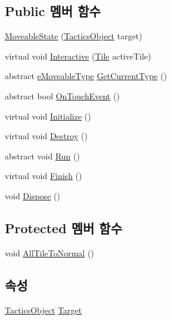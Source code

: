 \subsection*{Public 멤버 함수}
\begin{DoxyCompactItemize}
\item 
\hyperlink{class_move_decorator_1_1_moveable_state_ae0130d6fdd6bb1dfd07a1f4c202dd6b0}{Moveable\+State} (\hyperlink{class_tactics_object}{Tactics\+Object} target)
\item 
virtual void \hyperlink{class_move_decorator_1_1_moveable_state_a1e66885aa7daf1021fc654b706b53ab8}{Interactive} (\hyperlink{class_tile}{Tile} active\+Tile)
\item 
abstract \hyperlink{_move_decorator_8cs_a90215797ba850e199f3ef63d7c56f132}{e\+Moveable\+Type} \hyperlink{class_move_decorator_1_1_moveable_state_a4759ac86dafc924c1de16e715c759ad6}{Get\+Current\+Type} ()
\item 
abstract bool \hyperlink{class_move_decorator_1_1_moveable_state_a157667c151f6b77c89f0ea7f37858525}{On\+Touch\+Event} ()
\item 
virtual void \hyperlink{class_m_c_n_1_1_state_a5be59bc891e64cbbe4322d74a6746908}{Initialize} ()
\item 
virtual void \hyperlink{class_m_c_n_1_1_state_aebf48ef248bbf185d6aae91d9789459e}{Destroy} ()
\item 
abstract void \hyperlink{class_m_c_n_1_1_state_afdec72a816a8a8ec584cac758a027215}{Run} ()
\item 
virtual void \hyperlink{class_m_c_n_1_1_state_a2492ca731678b8216c02134dddeeb745}{Finish} ()
\item 
void \hyperlink{class_m_c_n_1_1_state_af6df0477e0dead784489688cb2c2093e}{Dispose} ()
\end{DoxyCompactItemize}
\subsection*{Protected 멤버 함수}
\begin{DoxyCompactItemize}
\item 
void \hyperlink{class_move_decorator_1_1_moveable_state_a2b63f058084f2548f8547c21715d271c}{All\+Tile\+To\+Normal} ()
\end{DoxyCompactItemize}
\subsection*{속성}
\begin{DoxyCompactItemize}
\item 
\hyperlink{class_tactics_object}{Tactics\+Object} \hyperlink{class_m_c_n_1_1_state_a79a563b32f183c9adc9a96679fc57eb8}{Target}
\end{DoxyCompactItemize}


